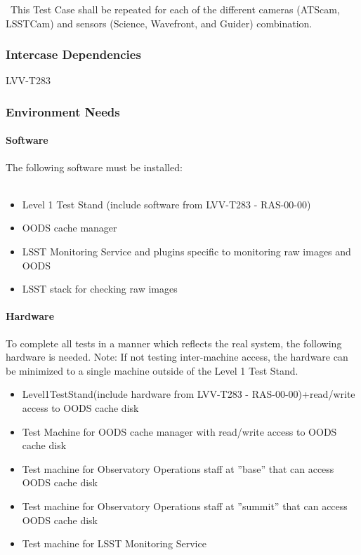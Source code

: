 ~This Test Case shall be repeated for each of the different cameras
(ATScam, LSSTCam) and sensors (Science, Wavefront, and Guider)
combination.



\subsubsection{Intercase Dependencies}
LVV-T283


\subsubsection{Environment Needs}

\paragraph{Software}
The following software must be installed:\\
~\\

\begin{itemize}
\tightlist
\item
  Level 1 Test Stand (include software from LVV-T283 - RAS-00-00)
\item
  OODS cache manager
\item
  LSST Monitoring Service and plugins specific to monitoring raw images
  and OODS~
\item
  LSST stack for checking raw images
\end{itemize}


\paragraph{Hardware}
To complete all tests in a manner which reflects the real system, the
following hardware is needed. Note: If not testing inter-machine access,
the hardware can be minimized to a single machine outside of the Level 1
Test Stand.

\begin{itemize}
\tightlist
\item
  Level1TestStand(include hardware from LVV-T283 - RAS-00-00)+read/write
  access to OODS cache disk
\item
  Test Machine for OODS cache manager with read/write access to OODS
  cache disk
\item
  Test machine for Observatory Operations staff at ''base'' that can
  access OODS cache disk
\item
  Test machine for Observatory Operations staff at ''summit'' that can
  access OODS cache disk
\item
  Test machine for LSST Monitoring Service
\end{itemize}

